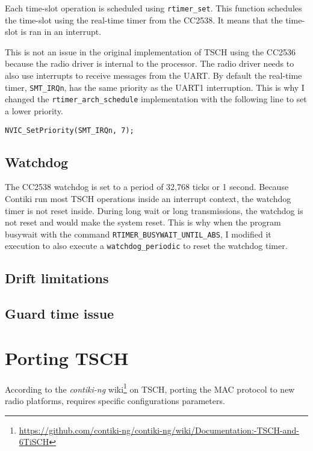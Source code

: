 Each time-slot operation is scheduled using \lstinline{rtimer_set}.
This function schedules the time-slot using the real-time timer from the CC2538.
It means that the time-slot is ran in an interrupt.

This is not an issue in the original implementation of TSCH using the CC2536
because the radio driver is internal to the processor.
The radio driver needs to also use interrupts to receive messages from the UART.
By default the real-time timer, \lstinline{SMT_IRQn}, has the same priority as
the UART1 interruption. 
This is why I changed the \lstinline{rtimer_arch_schedule} implementation with
the following line to set a lower priority.

\begin{lstlisting}
NVIC_SetPriority(SMT_IRQn, 7); 
\end{lstlisting}

\subsection{Watchdog}

The CC2538 watchdog is set to a period of 32,768 ticks or 1 second. 
Because Contiki run most TSCH operations inside an interrupt
context, the watchdog timer is not reset inside.
During long wait or long transmissions, the watchdog is not reset and would
make the system reset.
This is why when the program busywait with the command
\lstinline{RTIMER_BUSYWAIT_UNTIL_ABS}, I modified it execution to also execute
a \lstinline{watchdog_periodic} to reset the watchdog timer.

\subsection{Drift limitations}

\subsection{Guard time issue}

\section{Porting TSCH}

According to the \emph{contiki-ng}
wiki\footnote{\url{https://github.com/contiki-ng/contiki-ng/wiki/Documentation:-TSCH-and-6TiSCH}}
on TSCH, porting the MAC protocol to new radio platforms, requires specific
configurations parameters.

